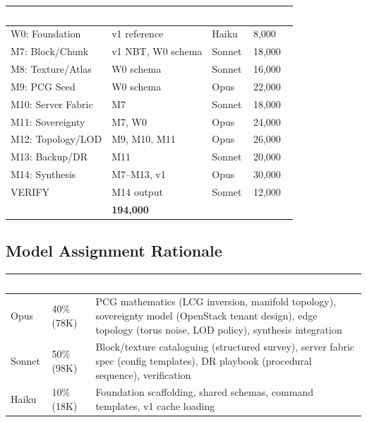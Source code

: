 \documentclass[11pt,letterpaper]{article}
\newcommand{\tableheader}[1]{\textbf{\sffamily\textcolor{white}{#1}}}
\begin{document}
\begin{center}
\begin{tabularx}{\textwidth}{L{3cm}L{3cm}C{2cm}C{2cm}}
\toprule
{}
\tableheader{Component} & \tableheader{Dependencies} & \tableheader{Model} & \tableheader{Tokens} \\
\midrule
W0: Foundation & v1 reference & Haiku & 8,000 \\
M7: Block/Chunk & v1 NBT, W0 schema & Sonnet & 18,000 \\
M8: Texture/Atlas & W0 schema & Sonnet & 16,000 \\
M9: PCG Seed & W0 schema & Opus & 22,000 \\
M10: Server Fabric & M7 & Sonnet & 18,000 \\
M11: Sovereignty & M7, W0 & Opus & 24,000 \\
M12: Topology/LOD & M9, M10, M11 & Opus & 26,000 \\
M13: Backup/DR & M11 & Sonnet & 20,000 \\
M14: Synthesis & M7--M13, v1 & Opus & 30,000 \\
VERIFY & M14 output & Sonnet & 12,000 \\
\midrule
{}
 & \textbf{194,000} \\
\bottomrule
\end{tabularx}
\end{center}

\subsection{Model Assignment Rationale}

\begin{center}
\begin{tabularx}{\textwidth}{L{2cm}C{2cm}X}
\toprule
{}
\tableheader{Model} & \tableheader{Share} & \tableheader{Rationale} \\
\midrule
Opus & 40\% (78K) & PCG mathematics (LCG inversion, manifold topology), sovereignty model (OpenStack tenant design), edge topology (torus noise, LOD policy), synthesis integration \\
Sonnet & 50\% (98K) & Block/texture cataloguing (structured survey), server fabric spec (config templates), DR playbook (procedural sequence), verification \\
Haiku & 10\% (18K) & Foundation scaffolding, shared schemas, command templates, v1 cache loading \\
\bottomrule
\end{tabularx}
\end{center}
\end{document}
